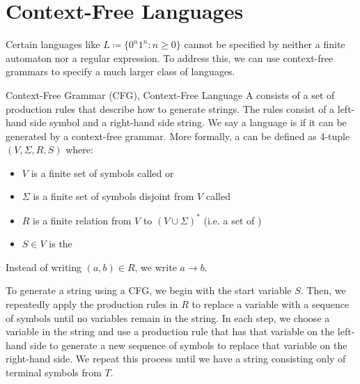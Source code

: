 \chapter{Context-Free Languages}
Certain languages like $L \coloneq \{ 0^n 1^n : n \geq 0 \}$ cannot be specified by neither a finite automaton nor a regular expression. To address this, we can use context-free grammars to specify a much larger class of languages.

\begin{dfnbox}{Context-Free Grammar (CFG), Context-Free Language}{}
    A  consists of a set of production rules that describe how to generate strings. The rules consist of a left-hand side symbol and a right-hand side string. We say a language is  if it can be generated by a context-free grammar.
    \tcblower
    More formally, a  can be defined as 4-tuple $(V, \Sigma, R, S)$ where:
    \begin{itemize}[noitemsep]
        \item $V$ is a finite set of symbols called  or 
        \item $\Sigma$ is a finite set of symbols disjoint from $V$ called 
        \item $R$ is a finite relation from $V$ to $(V \cup \Sigma)^*$ (i.e. a set of )
        \item $S \in V$ is the 
    \end{itemize}
    Instead of writing $(a, b) \in R$, we write $a \to b$.
\end{dfnbox}

To generate a string using a CFG, we begin with the start variable $S$. Then, we repeatedly apply the production rules in $R$ to replace a variable with a sequence of symbols until no variables remain in the string. In each step, we choose a variable in the string and use a production rule that has that variable on the left-hand side to generate a new sequence of symbols to replace that variable on the right-hand side. We repeat this process until we have a string consisting only of terminal symbols from $T$.


